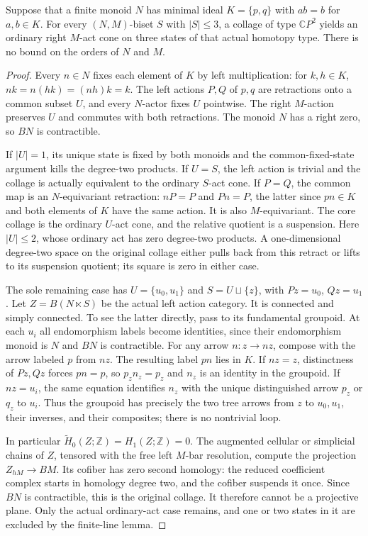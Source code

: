 \begin{lemma}
\label{C:right-zero-minimal-two-three-states}
Suppose that a finite monoid $N$ has minimal ideal
$K=\{p,q\}$ with $ab=b$ for $a,b\in K$.
For every $(N,M)$-biset $S$ with $|S|\leq3$, a collage of type
$\mathbb CP^2$ yields an ordinary right $M$-act cone on three
states of that actual homotopy type.
There is no bound on the orders of $N$ and $M$.
\end{lemma}
\begin{proof}
Every $n\in N$ fixes each element of $K$ by left multiplication:
for $k,h\in K$, $nk=n(hk)=(nh)k=k$.
The left actions $P,Q$ of $p,q$ are retractions onto a common
subset $U$, and every $N$-actor fixes $U$ pointwise.
The right $M$-action preserves $U$ and commutes with both
retractions. The monoid $N$ has a right zero, so $BN$ is
contractible.

If $|U|=1$, its unique state is fixed by both monoids and the
common-fixed-state argument kills the degree-two products.
If $U=S$, the left action is trivial and the collage is actually
equivalent to the ordinary $S$-act cone.
If $P=Q$, the common map is an $N$-equivariant retraction:
$nP=P$ and $Pn=P$, the latter since $pn\in K$ and both elements
of $K$ have the same action. It is also $M$-equivariant.
The core collage is the ordinary $U$-act cone, and the relative
quotient is a suspension. Here $|U|\leq2$, whose ordinary act
has zero degree-two products. A one-dimensional degree-two
space on the original collage either pulls back from this
retract or lifts to its suspension quotient; its square is
zero in either case.

The sole remaining case has $U=\{u_0,u_1\}$ and
$S=U\sqcup\{z\}$, with $Pz=u_0$, $Qz=u_1$.
Let $Z=B(N\ltimes S)$ be the actual left action category.
It is connected and simply connected. To see the latter
directly, pass to its fundamental groupoid. At each $u_i$
all endomorphism labels become identities, since their
endomorphism monoid is $N$ and $BN$ is contractible.
For any arrow $n:z\to nz$, compose with the arrow labeled
$p$ from $nz$. The resulting label $pn$ lies in $K$.
If $nz=z$, distinctness of $Pz,Qz$ forces $pn=p$, so
$p_z n_z=p_z$ and $n_z$ is an identity in the groupoid.
If $nz=u_i$, the same equation identifies $n_z$ with
the unique distinguished arrow $p_z$ or $q_z$ to $u_i$.
Thus the groupoid has precisely the two tree arrows from
$z$ to $u_0,u_1$, their inverses, and their composites;
there is no nontrivial loop.

In particular $\widetilde H_0(Z;\mathbb Z)=H_1(Z;\mathbb Z)=0$.
The augmented cellular or simplicial chains of $Z$, tensored
with the free left $M$-bar resolution, compute the projection
$Z_{hM}\to BM$. Its cofiber has zero second homology:
the reduced coefficient complex starts in homology degree two,
and the cofiber suspends it once. Since $BN$ is contractible,
this is the original collage. It therefore cannot be a
projective plane. Only the actual ordinary-act case remains,
and one or two states in it are excluded by the finite-line
lemma.
\end{proof}

